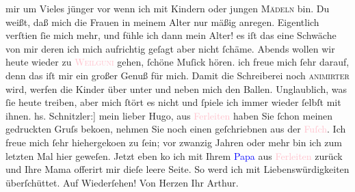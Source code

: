                mir um Vieles jünger vor wenn ich mit Kindern oder jungen \textsc{Mädeln} bin. Du weißt, daß mich die Frauen in meinem Alter nur mäßig anregen.
               Eigentlich verſti{\geminationm}en ſie mich mehr, und fühle ich dann
               mein Alter! es iſt das eine Schwäche von mir deren ich mich aufrichtig geſagt aber
               nicht ſchäme.\pend
           \pstart
           Abends wollen wir heute wieder zu \textcolor{pink}{\textsc{Weilguni}}{}\ledrightnote{\textcolor{pink}{Hotel Weilguni}} gehen, ſchöne Muſick hören. ich freue mich ſehr darauf, denn das iſt mir ein
               großer Genuß für mich.\pend
           \pstart
           Damit die Schreiberei noch \textsc{animirter} wird, werfen die
               Kinder über unter und neben mich den Ballen. Unglaublich, was ſie heute treiben, aber
               mich ſtört es nicht und ſpiele ich immer wieder ſelbſt mit ihnen. \pend
           {\bigskip}\pstart
           \noindent{}{\pb}{[}hs. Schnitzler:{]} mein lieber Hugo, aus \textcolor{pink}{Ferleiten}{}\ledrightnote{\textcolor{pink}{Ferleiten}} haben Sie ſchon meinen gedruckten Gruſs beko{\geminationm}en, nehmen Sie noch einen geſchriebnen aus der \textcolor{pink}{Fuſch}{}\ledrightnote{\textcolor{pink}{Fusch an der Großglocknerstraße}}. Ich freue mich ſehr hiehergeko{\geminationm}en zu ſein; vor zwanzig Jahren oder mehr bin ich zum
               letzten Mal hier geweſen. Jetzt eben ko{\geminationm} ich mit Ihrem
                  \textcolor{blue}{Papa}{} aus \textcolor{pink}{Ferleiten}{}\ledrightnote{\textcolor{pink}{Ferleiten}} zurück und Ihre Mama offerirt mir dieſe leere Seite.
               So werd ich mit Liebenswürdigkeiten überſchüttet.\pend
           \pstart
           Auf Wiederſehen!\pend
           \pstart Von Herzen Ihr \spacefill\mbox{Arthur.}\pend{}\endnumbering{}  
      